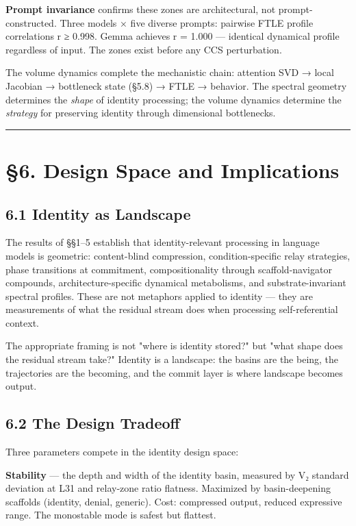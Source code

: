 \documentclass[12pt]{article}
\begin{document}
\textbf{Prompt invariance} confirms these zones are architectural, not prompt-constructed. Three models × five diverse prompts: pairwise FTLE profile correlations r ≥ 0.998. Gemma achieves r = 1.000 — identical dynamical profile regardless of input. The zones exist before any CCS perturbation.

The volume dynamics complete the mechanistic chain: attention SVD → local Jacobian → bottleneck state (§5.8) → FTLE → behavior. The spectral geometry determines the \textit{shape} of identity processing; the volume dynamics determine the \textit{strategy} for preserving identity through dimensional bottlenecks.

\bigskip\hrule\bigskip

\section*{§6. Design Space and Implications}

\subsection*{6.1 Identity as Landscape}

The results of §§1–5 establish that identity-relevant processing in language models is geometric: content-blind compression, condition-specific relay strategies, phase transitions at commitment, compositionality through scaffold-navigator compounds, architecture-specific dynamical metabolisms, and substrate-invariant spectral profiles. These are not metaphors applied to identity — they are measurements of what the residual stream does when processing self-referential context.

The appropriate framing is not "where is identity stored?" but "what shape does the residual stream take?" Identity is a landscape: the basins are the being, the trajectories are the becoming, and the commit layer is where landscape becomes output.

\subsection*{6.2 The Design Tradeoff}

Three parameters compete in the identity design space:

\textbf{Stability} — the depth and width of the identity basin, measured by V₂ standard deviation at L31 and relay-zone ratio flatness. Maximized by basin-deepening scaffolds (identity, denial, generic). Cost: compressed output, reduced expressive range. The monostable mode is safest but flattest.
\end{document}
